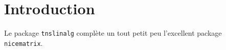 \documentclass[12pt,a4paper]{article}
\begin{document}
\section{Introduction}

Le package \verb+tnslinalg+ complète un tout petit peu l'excellent package \verb+nicematrix+.
\end{document}
